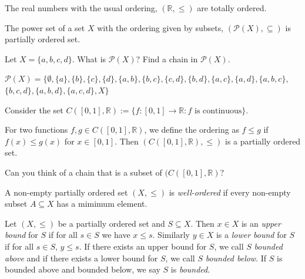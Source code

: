 \documentclass [aspectratio=169, handout]{beamer}
\newcommand{\R}{{\mathbb{R}}}
\newcommand{\cP}{\mathcal{P}}
\begin{document}
\begin{frame}
\begin{example}
The real numbers with the usual ordering, $(\R, \leq)$ are totally ordered. 
\end{example}

\begin{example}
The power set of a set $X$ with the ordering given by subsets, $(\cP(X), \subseteq)$ is partially ordered set. 
\end{example}
\end{frame}

\begin{frame}
\begin{example}
Let $X = \{a,b,c,d\}$. What is $\cP(X)$? Find a chain in $\cP(X)$.

\vspace{1em}
\pause
$\cP(X) = \{\emptyset,\{a\},\{b\},\{c\},\{d\},\{a,b\},\{b,c\},\{c,d\},\{b,d\},\{a,c\},\{a,d\},\{a,b,c\}, $
 $ \{b,c,d\},\{a,b,d\},\{a,c,d\},X\}$


\vspace{3cm}
\end{example}
\end{frame}

\begin{frame}
\begin{example}
Consider the set $C([0,1],\R):= \{f:[0,1] \to \R : f \text{ is continuous}\}$.

\vspace{1em}

For two functions $f,g \in C([0,1],\R)$, we define the ordering as $f \leq g$ if $f(x) \leq g(x)$ for $x \in [0,1]$. Then $(C([0,1],\R),\leq)$ is a partially ordered set. 

\vspace{1em}

Can you think of a chain that is a subset of $(C([0,1],\R)$?
\end{example}

\end{frame}



\begin{frame}
\begin{definition}
A non-empty partially ordered set $(X,\leq)$ is \emph{well-ordered} if every non-empty subset $A \subseteq X$ has a mimimum element.
\end{definition}

\begin{definition}%
Let $(X,\leq)$ be a partially ordered set and $S\subseteq X$. Then $x\in X$ is an \emph{upper bound} for $S$ if for all $s \in S$ we have $x\leq s$. Similarly $y\in X$ is a \emph{lower bound} for $S$ if for all $s\in S$, $y\leq s$. If there exists an upper bound for $S$, we call $S$ \emph{bounded above} and if there exists a lower bound for $S$, we call $S$ \emph{bounded below}. If $S$ is bounded above and bounded below, we say $S$ is \emph{bounded}. 
\end{definition}

\end{frame}
\end{document}
